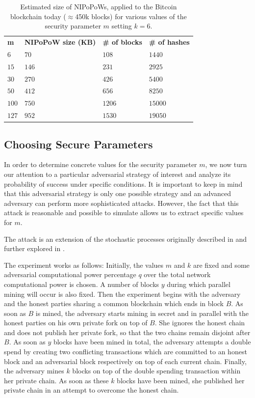 \begin{table}
  \caption{\label{table.size}
    Estimated size of NIPoPoWs, applied to the Bitcoin blockchain today ($\approx$450k blocks) for various values of the security parameter $m$
    setting $k = 6$.
  }
  \begin{tabular}{llll}
      {\bf m}  & {\bf NIPoPoW size (KB)} & {\bf \# of blocks} & {\bf
      \# of hashes}\\
      $6$   & $70$  & $108$ & $1440$  \\
      $15$  & $146$ & $231$ & $2925$  \\
      $30$  & $270$ & $426$ & $5400$  \\
      $50$  & $412$ & $656$ & $8250$ \\
      $100$ & $750$ & $1206$ & $15000$ \\
      $127$ & $952$ & $1530$ & $19050$ \\
  \end{tabular}
\end{table}


\subsection{Choosing Secure Parameters}
In order to determine concrete values for the security parameter $m$, we now
turn our attention to a particular adversarial strategy of interest and analyze
its probability of success under specific conditions. It is important to keep
in mind that this adversarial strategy is only one possible strategy and an
advanced adversary can perform more sophisticated attacks. However, the fact
that this attack is reasonable and possible to simulate allows us to extract
specific values for $m$.

The attack is an extension of the stochastic processes originally described in
\cite{bitcoin} and further explored in \cite{rosenfeld}.

The experiment works as follows: Initially, the values $m$ and $k$ are fixed
and some adversarial computational power percentage $q$ over the total network
computational power is chosen. A number of blocks $y$ during which parallel
mining will occur is also fixed. Then the experiment begins with the adversary
and the honest parties sharing a common blockchain which ends in block $B$. As
soon as $B$ is mined, the adversary starts mining in secret and in parallel
with the honest parties on his own private fork on top of $B$. She ignores the
honest chain and does not publish her private fork, so that the two chains
remain disjoint after $B$. As soon as $y$ blocks have been mined in total, the
adversary attempts a double spend by creating two conflicting transactions
which are committed to an honest block and an adversarial block respectively on
top of each current chain. Finally, the adversary mines $k$ blocks on top of
the double spending transaction within her private chain. As soon as these $k$
blocks have been mined, she published her private chain in an attempt to
overcome the honest chain.

